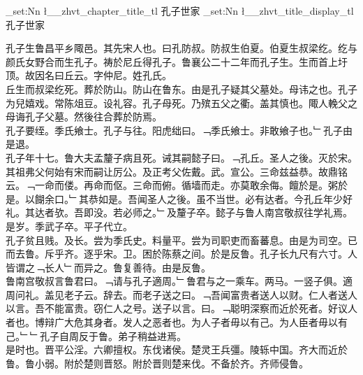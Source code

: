 \documentclass{zhvt-classic}
\begin{document}
\clearpage
\ExplSyntaxOn
\tl_set:Nn \l__zhvt_chapter_title_tl { 孔子世家 }
\tl_set:Nn \l__zhvt_title_display_tl { 孔子世家 }
\ExplSyntaxOff
\maketitle


\hspace*{2em}孔子生鲁昌平乡陬邑。其先宋人也。曰孔防叔。防叔生伯夏。伯夏生叔梁纥。纥与颜氏女野合而生孔子。祷於尼丘得孔子。鲁襄公二十二年而孔子生。生而首上圩顶。故因名曰丘云。字仲尼。姓孔氏。\\
\hspace*{2em}丘生而叔梁纥死。葬於防山。防山在鲁东。由是孔子疑其父墓处。母讳之也。孔子为兒嬉戏。常陈俎豆。设礼容。孔子母死。乃殡五父之衢。盖其慎也。陬人輓父之母诲孔子父墓。然後往合葬於防焉。\\
\hspace*{2em}孔子要绖。季氏飨士。孔子与往。阳虎绌曰。﹁季氏飨士。非敢飨子也。﹂孔子由是退。\\
\hspace*{2em}孔子年十七。鲁大夫孟釐子病且死。诫其嗣懿子曰。﹁孔丘。圣人之後。灭於宋。其祖弗父何始有宋而嗣让厉公。及正考父佐戴。武。宣公。三命兹益恭。故鼎铭云。﹁一命而偻。再命而伛。三命而俯。循墙而走。亦莫敢余侮。饘於是。粥於是。以餬余口。﹂其恭如是。吾闻圣人之後。虽不当世。必有达者。今孔丘年少好礼。其达者欤。吾即没。若必师之。﹂及釐子卒。懿子与鲁人南宫敬叔往学礼焉。是岁。季武子卒。平子代立。\\
\hspace*{2em}孔子贫且贱。及长。尝为季氏史。料量平。尝为司职吏而畜蕃息。由是为司空。已而去鲁。斥乎齐。逐乎宋。卫。困於陈蔡之间。於是反鲁。孔子长九尺有六寸。人皆谓之﹁长人﹂而异之。鲁复善待。由是反鲁。\\
\hspace*{2em}鲁南宫敬叔言鲁君曰。﹁请与孔子適周。﹂鲁君与之一乘车。两马。一竖子俱。適周问礼。盖见老子云。辞去。而老子送之曰。﹁吾闻富贵者送人以财。仁人者送人以言。吾不能富贵。窃仁人之号。送子以言。曰。﹁聪明深察而近於死者。好议人者也。博辩广大危其身者。发人之恶者也。为人子者毋以有己。为人臣者毋以有己。﹂﹂孔子自周反于鲁。弟子稍益进焉。\\
\hspace*{2em}是时也。晋平公淫。六卿擅权。东伐诸侯。楚灵王兵彊。陵轹中国。齐大而近於鲁。鲁小弱。附於楚则晋怒。附於晋则楚来伐。不备於齐。齐师侵鲁。\\
\end{document}
